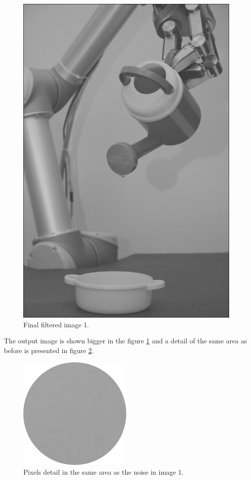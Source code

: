 \begin{figure}[!ht]
	\centering
	\includegraphics[height=0.75\textheight]{figures/1-imageFiltered}
	\caption{Final filtered image 1.}
	\label{fig:1-imageFiltered}
\end{figure}

The output image is shown bigger in the figure \ref{fig:1-imageFiltered} and a detail of the same area as before is presented in figure \ref{fig:1-filteredDetail}.

\begin{figure}[!ht]
	\centering
	\includegraphics[width=0.5\textwidth]{figures/1-filteredDetail}
	\caption{Pixels detail in the same area as the noise in image 1.}
	\label{fig:1-filteredDetail}
\end{figure}

